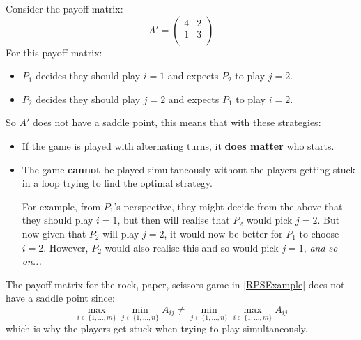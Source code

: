 \documentclass[../main.tex]{subfiles}
\begin{document}
\begin{example}
  Consider the payoff matrix:
  \[
    A' = \begin{pmatrix}
    4 & 2 \\
    1 & 3 \\
    \end{pmatrix}
  \]
  For this payoff matrix:
  \begin{itemize}
    \item $P_1$ decides they should play $i = 1$ and expects $P_2$ to play $j = 2$.
    \item $P_2$ decides they should play $j = 2$ and expects $P_1$ to play $i = 2$.
  \end{itemize}
  So $A'$ does not have a saddle point, this means that with these strategies:
  \begin{itemize}
    \item If the game is played with alternating turns, it \textbf{does matter} who starts.
    \item The game \textbf{cannot} be played simultaneously without the players getting stuck in a loop trying to find the optimal strategy.

      For example, from $P_1$'s perspective, they might decide from the above that they should play $i = 1$, but then will realise that $P_2$ would pick $j = 2$.
      But now given that $P_2$ will play $j = 2$, it would now be better for $P_1$ to choose $i = 2$.
      However, $P_2$ would also realise this and so would pick $j = 1$, \textit{and so on...}
  \end{itemize}
\end{example}
\begin{remark}
  The payoff matrix for the rock, paper, scissors game in \cref{RPSExample} does not have a saddle point since:
  \[
    \max_{i \in \{1, \ldots, m\}} \min_{j \in \{1, \ldots, n\}} A_{i j} \neq \min_{j \in \{1, \ldots, n\}} \max_{i \in \{1, \ldots, m\}} A_{i j}
  \]
  which is why the players get stuck when trying to play simultaneously.
\end{remark}
\end{document}
